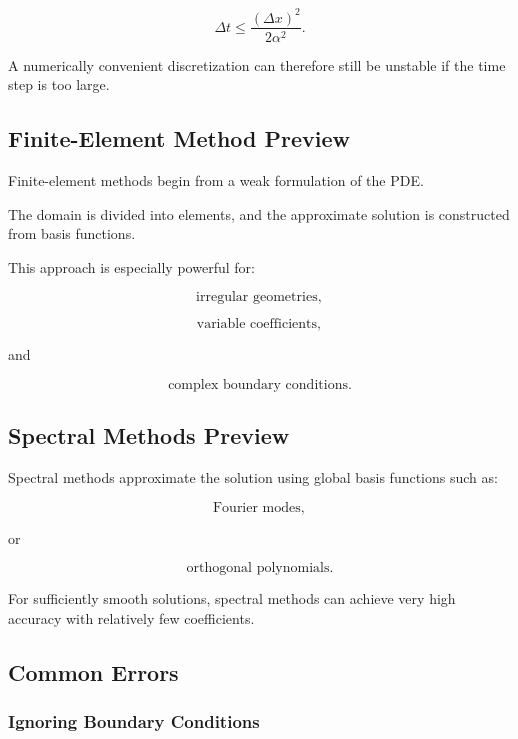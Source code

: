 \[
\boxed{
\Delta t
\leq
\frac{
(\Delta x)^2
}{
2\alpha^2
}.
}
\]

A numerically convenient discretization can therefore still be unstable
if the time step is too large.

\subsection{Finite-Element Method Preview}
\label{subsec:finite-element-preview}

Finite-element methods begin from a weak formulation of the PDE.

The domain is divided into elements, and the approximate solution is
constructed from basis functions.

This approach is especially powerful for:

\[
\boxed{
\text{irregular geometries},
}
\]

\[
\boxed{
\text{variable coefficients},
}
\]

and

\[
\boxed{
\text{complex boundary conditions}.
}
\]

\subsection{Spectral Methods Preview}
\label{subsec:spectral-methods-pde-preview}

Spectral methods approximate the solution using global basis functions
such as:

\[
\boxed{
\text{Fourier modes},
}
\]

or

\[
\boxed{
\text{orthogonal polynomials}.
}
\]

For sufficiently smooth solutions, spectral methods can achieve very high
accuracy with relatively few coefficients.

\subsection{Common Errors}
\label{subsec:pde-common-errors}

\subsubsection{Ignoring Boundary Conditions}

